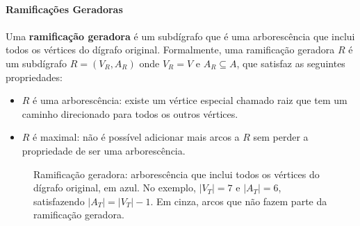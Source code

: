 \documentclass[12pt,a4paper]{article}
\def\\{}%
\begin{document}
\paragraph{Ramificações Geradoras}
\paragraph{}Uma \textbf{ramificação geradora} é um subdígrafo que é uma arborescência que inclui todos os vértices do dígrafo original. Formalmente, uma ramificação geradora \(R\) é um subdígrafo \(R = (V_R, A_R)\) onde \(V_R = V\) e \(A_R \subseteq A\), que satisfaz as seguintes propriedades:
\begin{itemize}
    \item \(R\) é uma arborescência: existe um vértice especial chamado raiz que tem um caminho direcionado para todos os outros vértices.
    \item \(R\) é maximal: não é possível adicionar mais arcos a \(R\) sem perder a propriedade de ser uma arborescência.
\end{itemize}

\begin{figure}[H]
\centering
{}
\caption{Ramificação geradora: arborescência que inclui todos os vértices do dígrafo original, em azul. No exemplo, $|V_T|=7$ e $|A_T|=6$, satisfazendo $|A_T|=|V_T|-1$. Em cinza, arcos que não fazem parte da ramificação geradora.}
\label{fig:ramificacao-geradora}
\end{figure} 
\end{document}
